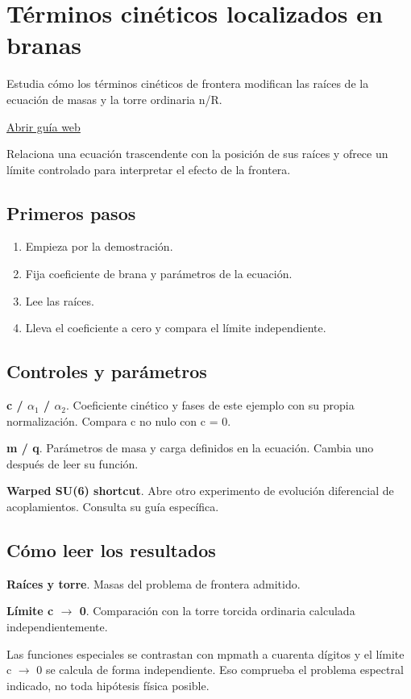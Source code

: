 \documentclass[11pt,a4paper]{article}
\begin{document}
\section{Términos cinéticos localizados en branas}
Estudia cómo los términos cinéticos de frontera modifican las raíces de la ecuación de masas y la torre ordinaria n/R.

\href{https://karlesmarin.github.io/ghu-explorer/guide/es/blkt/index.html}{Abrir guía web}

Relaciona una ecuación trascendente con la posición de sus raíces y ofrece un límite controlado para interpretar el efecto de la frontera.
\subsection*{Primeros pasos}
\begin{enumerate}
\item Empieza por la demostración.
\item Fija coeficiente de brana y parámetros de la ecuación.
\item Lee las raíces.
\item Lleva el coeficiente a cero y compara el límite independiente.
\end{enumerate}
\subsection*{Controles y parámetros}
\textbf{c / \ensuremath{\alpha}\ensuremath{{}_{1}} / \ensuremath{\alpha}\ensuremath{{}_{2}}}. Coeficiente cinético y fases de este ejemplo con su propia normalización. Compara c no nulo con c = 0.

\textbf{m / q}. Parámetros de masa y carga definidos en la ecuación. Cambia uno después de leer su función.

\textbf{Warped SU(6) shortcut}. Abre otro experimento de evolución diferencial de acoplamientos. Consulta su guía específica.

\subsection*{Cómo leer los resultados}
\textbf{Raíces y torre}. Masas del problema de frontera admitido.

\textbf{Límite c \ensuremath{\rightarrow} 0}. Comparación con la torre torcida ordinaria calculada independientemente.

Las funciones especiales se contrastan con mpmath a cuarenta dígitos y el límite c \ensuremath{\rightarrow} 0 se calcula de forma independiente. Eso comprueba el problema espectral indicado, no toda hipótesis física posible.
\end{document}
